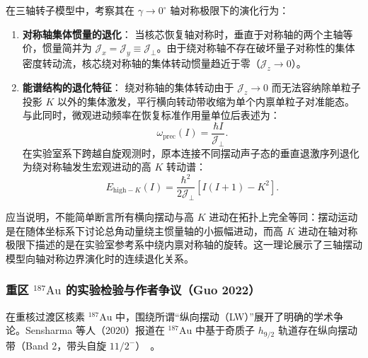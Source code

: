 在三轴转子模型中，考察其在 $\gamma \to 0^\circ$ 轴对称极限下的演化行为：
\begin{enumerate}
\item \textbf{对称轴集体惯量的退化}：
当核芯恢复轴对称时，垂直于对称轴的两个主轴等价，惯量简并为 $\mathcal{J}_x = \mathcal{J}_y \equiv \mathcal{J}_\perp$。由于绕对称轴不存在破坏量子对称性的集体密度转动流，核芯绕对称轴的集体转动惯量趋近于零（$\mathcal{J}_z \to 0$）。
\item \textbf{能谱结构的退化特征}：
绕对称轴的集体转动由于 $\mathcal{J}_z \to 0$ 而无法容纳除单粒子投影 $K$ 以外的集体激发，平行横向转动带收缩为单个内禀单粒子对准能态。与此同时，微观进动频率在恢复标准作用量单位后表述为：
\begin{equation}\label{eq:4-4-precession-freq}
\omega_{\mathrm{prec}}(I) = \frac{\hbar I}{\mathcal{J}_\perp}.
\end{equation}
在实验室系下跨越自旋观测时，原本连接不同摆动声子态的垂直退激序列退化为绕对称轴发生宏观进动的高 $K$ 转动谱：
\begin{equation}\label{eq:4-4-high-k-energy-formula}
E_{\mathrm{high-}K}(I) = \frac{\hbar^2}{2\mathcal{J}_\perp} \left[ I(I+1) - K^2 \right].
\end{equation}
\end{enumerate}

应当说明，不能简单断言所有横向摆动与高 $K$ 进动在拓扑上完全等同：摆动运动是在随体坐标系下讨论总角动量绕主惯量轴的小振幅进动，而高 $K$ 进动在轴对称极限下描述的是在实验室参考系中绕内禀对称轴的旋转。这一理论展示了三轴摆动模型向轴对称边界演化时的连续退化关系。

\subsubsection{重区 $^{187}\mathrm{Au}$ 的实验检验与作者争议（Guo 2022）}

在重核过渡区核素 $^{187}\mathrm{Au}$ 中，围绕所谓“纵向摆动（LW）”展开了明确的学术争论。Sensharma 等人（2020）报道在 $^{187}\mathrm{Au}$ 中基于奇质子 $h_{9/2}$ 轨道存在纵向摆动带（Band 2，带头自旋 $11/2^-$）~\cite{sensharma-2020-longitudinal-wobbling-187au}。

